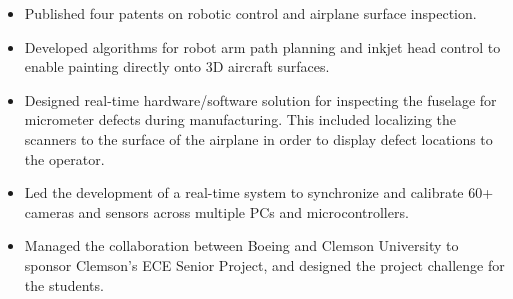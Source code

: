 \documentclass[10pt,a4paper,ragged2e,withhyper]{altacv}
\begin{document}
\begin{paracol}{2}
\begin{itemize}
\item Published four patents on robotic control and airplane surface inspection.
\item Developed algorithms for robot arm path planning and inkjet head control to enable painting directly onto 3D aircraft surfaces. 
\item Designed real-time hardware/software solution for inspecting the fuselage for micrometer defects during manufacturing. This included localizing the scanners to the surface of the airplane in order to display defect locations to the operator.
\item Led the development of a real-time system to synchronize and calibrate 60+ cameras and sensors across multiple PCs and microcontrollers.
\item Managed the collaboration between Boeing and Clemson University to sponsor Clemson’s ECE Senior Project, and designed the project challenge for the students.
\end{itemize}





\medskip





\switchcolumn


\end{paracol}
\end{document}
